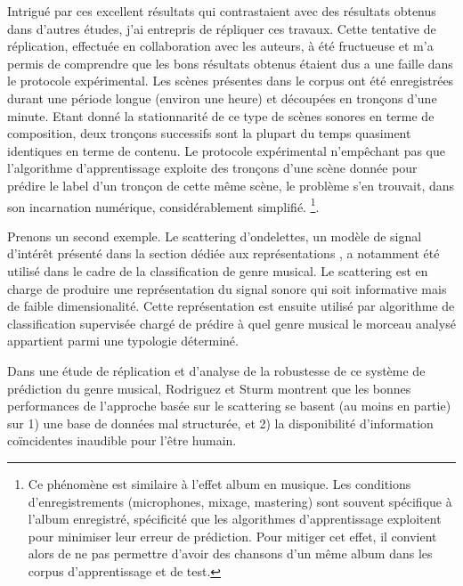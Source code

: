  Intrigué par ces excellent résultats qui contrastaient avec des résultats obtenus dans d'autres études, j'ai entrepris de répliquer ces travaux. Cette tentative de réplication, effectuée en collaboration avec les auteurs, à été fructueuse et m'a permis de comprendre que les bons résultats obtenus étaient dus a une faille dans le protocole expérimental\cite{lagrange2015}. Les scènes présentes dans le corpus ont été enregistrées durant une période longue (environ une heure) et découpées en tronçons d'une minute. Etant donné la stationnarité de ce type de scènes sonores en terme de composition, deux tronçons successifs sont la plupart du temps quasiment identiques en terme de contenu. Le protocole expérimental n'empêchant pas que l'algorithme d'apprentissage exploite des tronçons d'une scène donnée pour prédire le label d'un tronçon de cette même scène, le problème s'en trouvait, dans son incarnation numérique, considérablement simplifié. \footnote{Ce phénomène est similaire à l'effet \og album \fg en musique. Les conditions d'enregistrements (microphones, mixage, mastering) sont souvent spécifique à l'album enregistré, spécificité que les algorithmes d'apprentissage exploitent pour minimiser leur erreur de prédiction. Pour mitiger cet effet, il convient alors de ne pas permettre d'avoir des chansons d'un même album dans les corpus d'apprentissage et de test.}.

  Prenons un second exemple. Le scattering d'ondelettes, un modèle de signal d'intérêt présenté dans la section dédiée aux représentations , a notamment été utilisé dans le cadre de la classification de genre musical\cite{anden2014deep}. Le scattering est en charge de produire une représentation du signal sonore qui soit informative mais de faible dimensionalité. Cette représentation est ensuite utilisé par algorithme de classification supervisée chargé de prédire à quel genre musical le morceau analysé appartient parmi une typologie déterminé.

  Dans une étude de réplication et d'analyse de la robustesse de ce système de prédiction du genre musical\cite{rodriguez2016analysing}, Rodriguez et Sturm montrent que les bonnes performances de l'approche basée sur le scattering se basent (au moins en partie) sur 1) une base de données mal structurée, et 2) la disponibilité d'information coïncidentes inaudible pour l'être humain.

